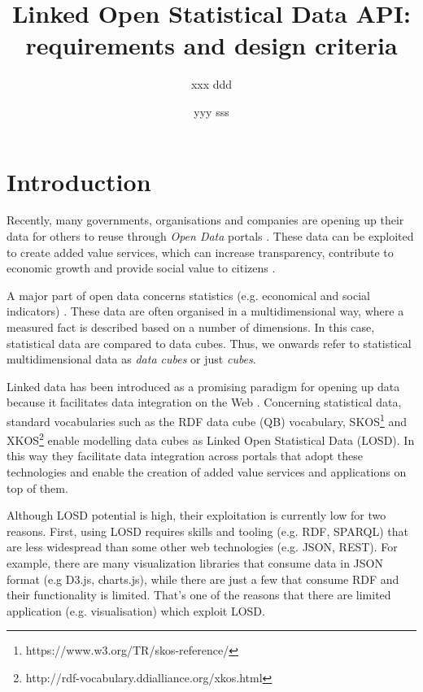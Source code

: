 \documentclass{llncs}
\begin{document}
\title{Linked Open Statistical Data API: requirements and design criteria}

\author{xxx ddd \and yyy sss}

\maketitle

\begin{abstract}

\end{abstract}

\section{Introduction}\label{sec:intro}

Recently, many governments, organisations and companies are opening up their data for others to reuse through \textit{Open Data} portals  \cite{Kalampokis:2011:IJWET}. These data can be exploited to create added value services, which can increase transparency, contribute to economic growth and provide social value to citizens \cite{Janssen:2012}.

A major part of open data concerns statistics (e.g. economical and social indicators) \cite{Capadisli:2013}. These data are often organised in a multidimensional way, where a measured fact is described based on a number of dimensions. In this case, statistical data are compared to data cubes. Thus, we onwards refer to statistical multidimensional data as \textit{data cubes} or just \textit{cubes}.

Linked data has been introduced as a promising paradigm for opening up data because it facilitates data integration on the Web \cite{Bizer:2009}. Concerning statistical data, standard vocabularies such as the RDF data cube (QB) vocabulary\cite{Cyganiak:2014:W3C}, SKOS\footnote{https://www.w3.org/TR/skos-reference/} and XKOS\footnote{http://rdf-vocabulary.ddialliance.org/xkos.html} enable modelling data cubes as Linked Open Statistical Data (LOSD). In this way they facilitate data integration across portals that adopt these technologies and enable the creation of added value services and applications on top of them.

Although LOSD potential is high, their exploitation is currently low for two reasons. First, using LOSD requires skills and tooling (e.g. RDF, SPARQL) that are less widespread than some other web technologies (e.g. JSON, REST). For example, there are many visualization libraries that consume data in JSON format (e.g D3.js, charts.js), while there are just a few that consume RDF and their functionality is limited. That's one of the reasons that there are limited application (e.g. visualisation) which exploit LOSD.
\end{document}
